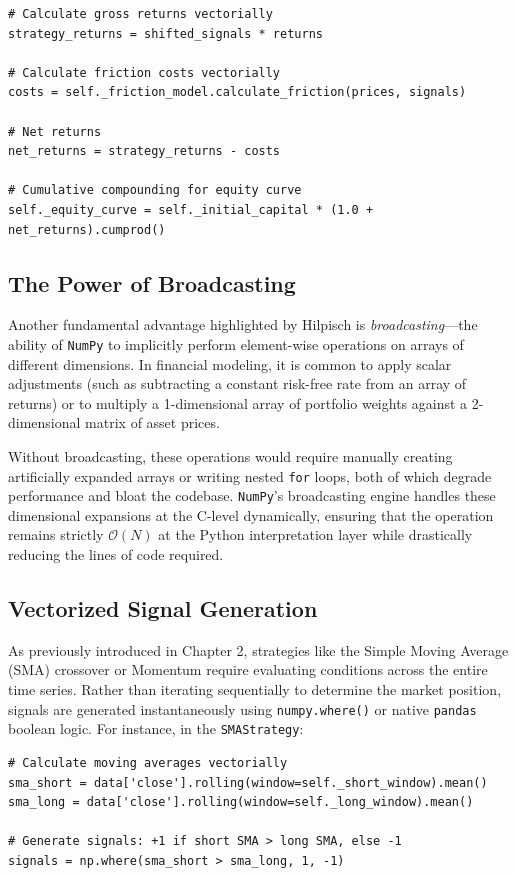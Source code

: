 \begin{verbatim}
# Calculate gross returns vectorially
strategy_returns = shifted_signals * returns

# Calculate friction costs vectorially
costs = self._friction_model.calculate_friction(prices, signals)

# Net returns
net_returns = strategy_returns - costs

# Cumulative compounding for equity curve
self._equity_curve = self._initial_capital * (1.0 + net_returns).cumprod()
\end{verbatim}

\subsection{The Power of Broadcasting}
Another fundamental advantage highlighted by Hilpisch \cite{hilpisch2018} is \textit{broadcasting}---the ability of \texttt{NumPy} to implicitly perform element-wise operations on arrays of different dimensions. In financial modeling, it is common to apply scalar adjustments (such as subtracting a constant risk-free rate from an array of returns) or to multiply a 1-dimensional array of portfolio weights against a 2-dimensional matrix of asset prices. 

Without broadcasting, these operations would require manually creating artificially expanded arrays or writing nested \texttt{for} loops, both of which degrade performance and bloat the codebase. \texttt{NumPy}'s broadcasting engine handles these dimensional expansions at the C-level dynamically, ensuring that the operation remains strictly \(\mathcal{O}(N)\) at the Python interpretation layer while drastically reducing the lines of code required.

\subsection{Vectorized Signal Generation}

As previously introduced in Chapter 2, strategies like the Simple Moving Average (SMA) crossover or Momentum require evaluating conditions across the entire time series. Rather than iterating sequentially to determine the market position, signals are generated instantaneously using \texttt{numpy.where()} or native \texttt{pandas} boolean logic. For instance, in the \texttt{SMAStrategy}:

\begin{verbatim}
# Calculate moving averages vectorially
sma_short = data['close'].rolling(window=self._short_window).mean()
sma_long = data['close'].rolling(window=self._long_window).mean()

# Generate signals: +1 if short SMA > long SMA, else -1
signals = np.where(sma_short > sma_long, 1, -1)
\end{verbatim}

